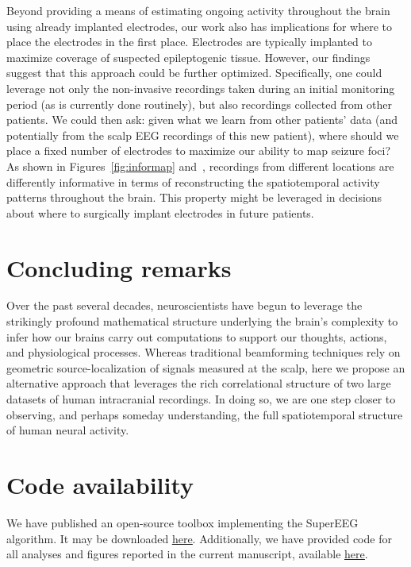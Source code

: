 \documentclass[11pt]{article}
\begin{document}
Beyond providing a means of estimating ongoing activity throughout the
brain using already implanted electrodes, our work also has
implications for where to place the electrodes in the first place.
Electrodes are typically implanted to maximize coverage of suspected
epileptogenic tissue.  However, our findings suggest that this
approach could be further optimized.  Specifically, one could leverage
not only the non-invasive recordings taken during an initial
monitoring period (as is currently done routinely), but also
recordings collected from other patients.  We could then ask: given
what we learn from other patients' data (and potentially from the
scalp EEG recordings of this new patient), where should we place a
fixed number of electrodes to maximize our ability to map seizure
foci?  As shown in Figures~\ref{fig:informap} and~\intersectmap, recordings from
different locations are differently informative in terms of
reconstructing the spatiotemporal activity patterns throughout the
brain.  This property might be leveraged in decisions about where to
surgically implant electrodes in future patients.

\section*{Concluding remarks}
Over the past several decades, neuroscientists have begun to leverage
the strikingly profound mathematical structure underlying the brain's
complexity to infer how our brains carry out computations to support
our thoughts, actions, and physiological processes.  Whereas
traditional beamforming techniques rely on geometric
source-localization of signals measured at the scalp, here we propose
an alternative approach that leverages the rich correlational
structure of two large datasets of human intracranial recordings.  In
doing so, we are one step closer to observing, and perhaps
someday understanding, the full spatiotemporal structure of human
neural activity.

\section*{Code availability}
We have published an open-source toolbox implementing the SuperEEG
algorithm.  It may be downloaded
\href{https://supereeg.readthedocs.io/en/latest/}{\underline{here}}. Additionally,
we have provided code for all analyses and figures reported in the
current manuscript, available
\href{https://github.com/ContextLab/supereeg_paper}{\underline{here}}.
\end{document}
